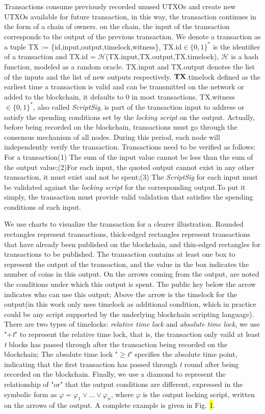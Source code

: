 \documentclass[conference]{IEEEtran}
\begin{document}
Transactions consume previously recorded unused UTXOs and create new UTXOs available for future transaction, in this way, the transaction continues in the form of a chain of owners. on the chain, the input of the transaction corresponds to the output of the previous transaction. We denote a transaction as a tuple TX := \{id,input,output,timelock,witness\}, TX.id$\in\{0,1\}^*$ is the identifier of a transaction and TX.id = $\mathcal H$(TX.input,TX.output,TX.timelock), $\mathcal H$ is a hash function, modeled as a random oracle. TX.input and TX.output denotes the list of the inputs and the list of new outputs respectively. $\bf TX$.timelock defined as the earliest time a transaction is valid and can be transmitted on the network or added to the blockchain, it defaults to 0 in most transactions. TX.witness$\in\{0,1\}^*$, also called \emph{ScriptSig}, is part of the transaction input to address or satisfy the spending conditions set by the \emph{locking script} on the output. Actually, before being recorded on the blockchain, transactions must go through the consensus mechanism of all nodes. During this period, each node will independently verify the transaction. Transactions need to be verified as follows: 
For a transaction(1) The sum of the input value cannot be less than the sum of the output value;(2)For each input, the quoted output cannot exist in any other transaction, it must exist and not be spent;(3) The \emph{ScriptSig} for each input must be validated against the \emph{locking script} for the corresponding output.To put it simply, the transaction must provide valid validation that satisfies the spending conditions of each input.

We use charts to visualize the transaction for a clearer illustration. Rounded rectangles represent transactions, thick-edged rectangles represent transactions that have already been published on the blockchain, and thin-edged rectangles for transactions to be published. The transaction contains at least one box to represent the output of the transaction, and the value in the box indicates the number of 
coins in this output. On the arrows coming from the output, are noted the conditions under which this output is spent. The public key below the arrow indicates who can use this output; Above the arrow is the timelock for the output(in this work only uses timelock as additional condition, which in practice could be any script supported by the underlying blockchain scripting language). There are two types of timelocks: \emph{relative time lock} and \emph{absolute time lock}, we use "+\emph{t}" to represent the relative time lock, that is, the transaction only vaild at least \emph{t} blocks has passed through after the transaction being recorded on the blockchain; The absolute time lock "$\geq$\emph{t}" specifies the absolute time point, indicating that the first transaction has passed through \emph{t} round after being recorded on the blockchain. Finally, we use a diamond to represent the relationship of "or" that the output conditions are different, expressed in the symbolic form as $\varphi = \varphi_1 \vee ...\vee \varphi_n$, where $\varphi$ is the output locking script, written on the arrows of the output. A complete example is given in Fig. \colorbox{yellow}{1}.
\end{document}
